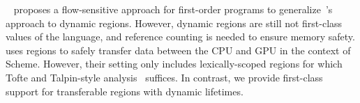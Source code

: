 ~\cite{HMN01} proposes a flow-sensitive approach for first-order programs
to generalize~\cite{tofte97}'s approach to dynamic regions.
However, dynamic regions are still not first-class values of the language,
and reference counting is needed to ensure memory safety.
%
\cite{gpu14} uses regions to safely transfer data between the CPU and GPU
in the context of Scheme. However, their setting only includes lexically-scoped
regions for which Tofte and Talpin-style analysis~\cite{tofte97}
suffices. In contrast, we provide first-class support for
transferable regions with dynamic lifetimes.
